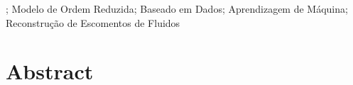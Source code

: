 \documentclass[dscexam, EN]{ufabcFHZh}
\begin{document}
\begin{abstract}
	
\end{abstract}
;
{Modelo de Ordem Reduzida};
{Baseado em Dados};
{Aprendizagem de Máquina};
{Reconstrução de Escomentos de Fluidos}


\listoffigures

\listoftables

\printloabbreviations
\printlosymbols

\printlistofalgorithms

\makeatletter \let\ps@plain\ps@empty \makeatother %
\tableofcontents

\setcounter{pagenumber_frontmatter}{\number\value{page}}

\mainmatter

\iftoggle{toggleVersaoFinal}
{\setcounter{page}{\number\value{pagenumber_frontmatter} + 2}}
{\setcounter{page}{\number\value{pagenumber_frontmatter} + 1}}

%
%
%
%

\chapter*{Abstract}
\end{document}

